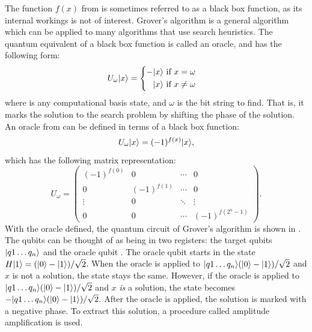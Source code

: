 The function $f(x)$ from  is sometimes referred to as a black box function, as its internal workings is not of interest.
Grover's algorithm is a general algorithm which can be applied to many algorithms that use search heuristics.
The quantum equivalent of a black box function is called an oracle, and has the following form:
\begin{equation} \label{eqn:oracle}
U_\omega\vert{x}\rangle = 
\begin{cases}
\begin{aligned}
-\vert{x}\rangle & \text{ if } x = \omega \\
\phantom{-}\vert{x}\rangle & \text{ if } x \neq \omega
\end{aligned}
\end{cases}
\end{equation}
where  is any computational basis state, and $\omega$ is the bit string to find.
That is, it marks the solution to the search problem by shifting the phase of the solution.
An oracle from  can be defined in terms of a black box function:
\begin{equation}
U_\omega\vert{x}\rangle = (-1)^{f(x)}\vert{x}\rangle,
\end{equation}
which has the following matrix representation:
\begin{equation}
U_\omega =
\begin{pmatrix}
(-1)^{f(0)} & 0 & \cdots & 0 \\
0 & (-1)^{f(1)} & \cdots & 0 \\
\vdots & 0 & \ddots & \vdots \\
0 & 0 & \cdots & (-1)^{f(2^n-1)}
\end{pmatrix}.
\end{equation}
With the oracle defined, the quantum circuit of Grover's algorithm is shown in .
The qubits can be thought of as being in two registers: the target qubits $\vert{q1\ldots q_n}\rangle$ and the oracle qubit .
The oracle qubit  starts in the state $H\vert{1}\rangle = (\vert{0}\rangle - \vert{1}\rangle)/\sqrt{2}$.
When the oracle is applied to $\vert{q1\ldots q_n}\rangle(\vert{0}\rangle - \vert{1}\rangle)/\sqrt{2}$ and $x$ is not a solution, the state stays the same.
However, if the oracle is applied to $\vert{q1\ldots q_n}\rangle(\vert{0}\rangle - \vert{1}\rangle)/\sqrt{2}$ and $x$ \emph{is} a solution, the state becomes $-\vert{q1\ldots q_n}\rangle(\vert{0}\rangle - \vert{1}\rangle)/\sqrt{2}$.
After the oracle is applied, the solution is marked with a negative phase.
To extract this solution, a procedure called amplitude amplification is used.
